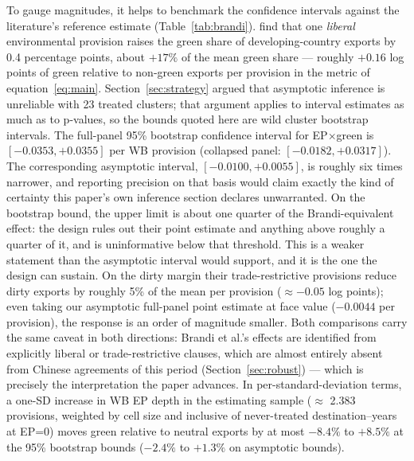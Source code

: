 \documentclass[12pt]{article}
\begin{document}
To gauge magnitudes, it helps to benchmark the confidence intervals against the
literature's reference estimate (Table~\ref{tab:brandi}). \citet{brandi2020} find that one \emph{liberal}
environmental provision raises the green share of developing-country exports by 0.4
percentage points, about $+17\%$ of the mean green share --- roughly $+0.16$ log points
of green relative to non-green exports per provision in the metric of
equation~\eqref{eq:main}. Section~\ref{sec:strategy} argued that asymptotic inference is
unreliable with 23 treated clusters; that argument applies to interval estimates as much
as to p-values, so the bounds quoted here are wild cluster bootstrap intervals. The
full-panel 95\% bootstrap confidence interval for EP$\times$green is
$[-0.0353, +0.0355]$ per WB provision (collapsed panel: $[-0.0182, +0.0317]$). The
corresponding asymptotic interval, $[-0.0100, +0.0055]$, is roughly six times narrower,
and reporting precision on that basis would claim exactly the kind of certainty this
paper's own inference section declares unwarranted. On the bootstrap bound, the upper
limit is about one quarter of the Brandi-equivalent effect: the design rules out their
point estimate and anything above roughly a quarter of it, and is uninformative below that
threshold. This is a weaker statement than the asymptotic interval would support, and it
is the one the design can sustain. On
the dirty margin their trade-restrictive provisions reduce dirty exports by roughly 5\%
of the mean per provision ($\approx -0.05$ log points); even taking our asymptotic
full-panel point estimate at face value ($-0.0044$ per provision), the response is an
order of magnitude smaller. Both comparisons carry the same caveat in both directions:
Brandi et al.'s effects are identified from explicitly liberal or trade-restrictive
clauses, which are almost entirely absent from Chinese agreements of this period
(Section~\ref{sec:robust}) --- which is precisely the interpretation the paper
advances. In per-standard-deviation terms, a one-SD increase in WB EP depth in the
estimating sample ($\approx$ 2.383 provisions, weighted by cell size and inclusive of
never-treated destination--years at EP=0) moves green relative to neutral exports by
at most $-8.4\%$ to $+8.5\%$ at the 95\% bootstrap bounds ($-2.4\%$ to $+1.3\%$ on
asymptotic bounds).



\begin{table}[htbp]
\centering
\caption{Triple-difference estimates: EP content and export composition}
\label{tab:main}

\end{table}
\end{document}
